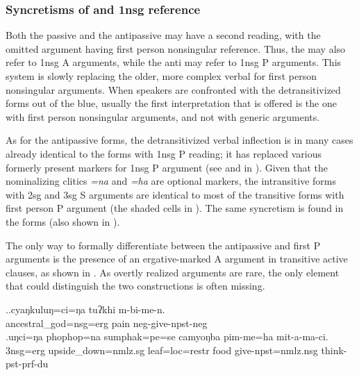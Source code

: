 \subsubsection{Syncretisms of  and {\sc 1nsg} re\-fe\-rence}\label{detrans-polite}

Both the passive and the antipassive may have a second reading, with the omitted argument having first person nonsingular reference. Thus, the  may also refer to 1{\sc nsg} A arguments, while the anti may refer to 1{\sc nsg}  P arguments. This system is slowly replacing the older, more complex verbal  for first person nonsingular arguments. When speakers are confronted with the detransitivized forms out of the blue, usually the first interpretation that is offered is the one with first person nonsingular arguments, and not with generic arguments. 

\largerpage[-1] 
As for the antipassive forms, the detransitivized verbal inflection is in many cases already identical to the forms with 1{\sc nsg}  P reading; it has replaced various formerly present markers for 1{\sc nsg}  P argument (see  and  in ).
Given that the nominalizing clitics \emph{=na} and \emph{=ha} are optional markers, the intransitive forms with 2sg and 3sg S arguments are identical to most of the transitive forms with first person P argument (the shaded cells in ). The same syncretism is found in the  forms (also shown in ).


The only way to formally differentiate between the antipassive and first   P arguments is the presence of an ergative-marked A argument in transitive active clauses, as shown in \Next. As overtly realized arguments are rare, the only  element that could distinguish the two constructions is often missing.  

\ex.\ag.cyaŋkuluŋ=ci=ŋa     tuʔkhi m-bi-me-n.\\
ancestral\_god{\sc =nsg=erg} pain {\sc neg-}give{\sc [3A;1.P]-npst-neg}\\
\bg.uŋci=ŋa   phophop=na  sumphak=pe=se   camyoŋba pim-me=ha mit-a-ma-ci.\\
{\sc 3nsg=erg} upside\_down{\sc =nmlz.sg} leaf{\sc =loc=restr} food  give{\sc [3A;1.P]-npst=nmlz.nsg} think{\sc -pst-prf-du}\\


